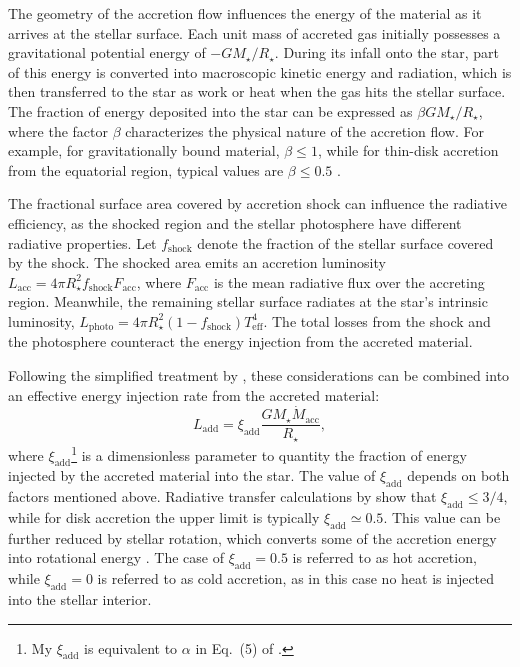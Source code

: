 \documentclass[12pt,a4paper]{article}
\newcommand{\mr}{\mathrm}
\begin{document}
The geometry of the accretion flow influences the energy of the material as it arrives at the stellar surface. Each unit mass of accreted gas initially possesses a gravitational potential energy of $-GM_\star/R_\star$. During its infall onto the star, part of this energy is converted into macroscopic kinetic energy and radiation, which is then transferred to the star as work or heat when the gas hits the stellar surface. The fraction of energy deposited into the star can be expressed as $\beta GM_\star / R_\star$, where the factor $\beta$ characterizes the physical nature of the accretion flow. For example, for gravitationally bound material, $\beta \leq 1$, while for thin-disk accretion from the equatorial region, typical values are $\beta \leq 0.5$ \parencite{PrialnikLivio1985,HartmannEtAl1998}.

The fractional surface area covered by accretion shock can influence the radiative efficiency, as the shocked region and the stellar photosphere have different radiative properties. Let $f_\mr{shock}$ denote the fraction of the stellar surface covered by the shock. The shocked area emits an accretion luminosity $L_\mr{acc} = 4\pi R_\star^2 f_\mr{shock} F_\mr{acc}$, where $F_\mr{acc}$ is the mean radiative flux over the accreting region. Meanwhile, the remaining stellar surface radiates at the star's intrinsic luminosity, $L_\mr{photo} = 4 \pi R_\star^2 (1 - f_\mr{shock}) T_\mr{eff}^4$. The total losses from the shock and the photosphere counteract the energy injection from the accreted material.

Following the simplified treatment by \textcite{HartmannEtAl1998}, these considerations can be combined into an effective energy injection rate from the accreted material:
\begin{equation}
  L_\mr{add} = \xi_\mr{add}\frac{GM_\star \dot{M}_\mr{acc}}{R_\star},
\end{equation}
where $\xi_\mr{add}$\footnote{My $\xi_\mr{add}$ is equivalent to $\alpha$ in Eq.~(5) of \textcite{HartmannEtAl1998}.} is a dimensionless parameter to quantity the fraction of energy injected by the accreted material into the star. The value of $\xi_\mr{add}$ depends on both factors mentioned above. Radiative transfer calculations by \textcite{StahlerEtAl1980} show that $\xi_\mr{add} \leq 3/4$, while for disk accretion the upper limit is typically $\xi_\mr{add} \simeq 0.5$. This value can be further reduced by stellar rotation, which converts some of the accretion energy into rotational energy \parencite{KunitomoEtAl2017}. The case of $\xi_\mr{add} = 0.5$ is referred to as hot accretion, while $\xi_\mr{add} = 0$ is referred to  as cold accretion, as in this case no heat is injected into the stellar interior.
\end{document}
